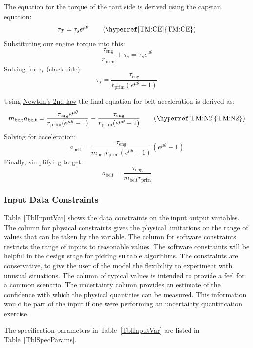 \documentclass[12pt]{article}
\begin{document}
The equation for the torque of the taut side is derived using the \hyperref[TM:CE]{capstan equation}:
\[\tau_T = \tau_s e^{\mu \theta} \tag*{\text{(\hyperref[TM:CE]{TM:CE})}}\]
Substituting our engine torque into this: \\
\[\frac{\tau_{\text{eng}}}{r_{\text{prim}}} + \tau_s = \tau_s e^{\mu \theta}\]
Solving for \(\tau_s\) (slack side): \\
\[\tau_s = \frac{\tau_{\text{eng}}}{r_{\text{prim}} (e^{\mu \theta} - 1)}\]
{\newline}

Using \hyperref[TM:N2]{Newton's 2nd law} the final equation for belt acceleration is derived as: \\
\[m_\text{belt} a_{\text{belt}} = \frac{\tau_{\text{eng}} e^{\mu \theta}}{r_{\text{prim}} (e^{\mu \theta} - 1)} - \frac{\tau_{\text{eng}}}{r_{\text{prim}} (e^{\mu \theta} - 1)}  \tag*{\text{(\hyperref[TM:N2]{TM:N2})}}\]
Solving for acceleration: \\
\[a_{\text{belt}} = \frac{\tau_{\text{eng}}}{m_\text{belt} r_{\text{prim}} (e^{\mu \theta} - 1)} (e^{\mu \theta} - 1)\]
Finally, simplifying to get: \\
\[a_{\text{belt}} = \frac{\tau_{\text{eng}}}{m_\text{belt} r_{\text{prim}}}\]



\subsubsection{Input Data Constraints} \label{sec_DataConstraints}    

Table~\ref{TblInputVar} shows the data constraints on the input output
variables.  The column for physical constraints gives the physical limitations
on the range of values that can be taken by the variable.  The column for
software constraints restricts the range of inputs to reasonable values.  The
software constraints will be helpful in the design stage for picking suitable
algorithms.  The constraints are conservative, to give the user of the model the
flexibility to experiment with unusual situations.  The column of typical values
is intended to provide a feel for a common scenario.  The uncertainty column
provides an estimate of the confidence with which the physical quantities can be
measured.  This information would be part of the input if one were performing an
uncertainty quantification exercise.

The specification parameters in Table~\ref{TblInputVar} are listed in
Table~\ref{TblSpecParams}.
\end{document}
